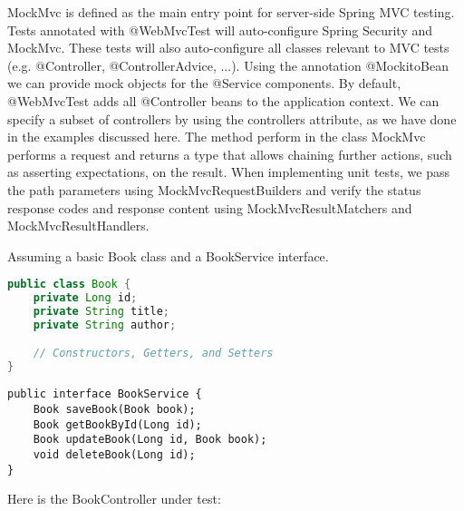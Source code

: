MockMvc is defined as the main entry point for server-side Spring MVC testing.
Tests annotated with @WebMvcTest will auto-configure Spring Security and MockMvc.  These tests will also auto-configure all classes relevant to MVC tests (e.g. @Controller,  @ControllerAdvice, ...).  Using the annotation @MockitoBean we can provide mock objects for the @Service components.
By default, @WebMvcTest adds all @Controller beans to the application context. We can specify a subset of controllers by using the controllers attribute, as we have done in the examples discussed here. 
The method perform in the class MockMvc performs a request and returns a type that allows chaining further actions,  such as asserting expectations,  on the result.
When implementing unit tests, we pass the path parameters using MockMvcRequestBuilders and verify the status response codes and response content using MockMvcResultMatchers and MockMvcResultHandlers.

Assuming a basic Book class and a BookService interface.

\begin{lstlisting}[language=java, frame=single]
public class Book {
    private Long id;
    private String title;
    private String author;

    // Constructors, Getters, and Setters
}
\end{lstlisting}

\begin{lstlisting}
public interface BookService {
    Book saveBook(Book book);
    Book getBookById(Long id);
    Book updateBook(Long id, Book book);
    void deleteBook(Long id);
}
\end{lstlisting}

Here is the BookController under test:

